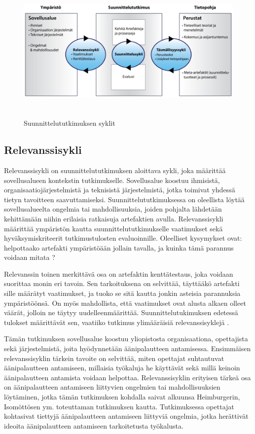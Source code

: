 \documentclass[utf8]{gradu3}
\begin{document}
\begin{figure}[h]\centering
  \includegraphics[height=7cm,keepaspectratio]{DSR}
  \caption[]{Suunnittelututkimuksen syklit}
  \label{fig:dsr}
\end{figure}

\subsection{Relevanssisykli}

Relevanssisykli on suunnittelututkimuksen aloittava sykli, joka määrittää sovellusalueen kontekstin tutkimukselle. Sovellusalue koostuu ihmisistä, organisaatiojärjestelmistä ja teknisistä järjestelmistä, jotka toimivat yhdessä tietyn tavoitteen saavuttamiseksi. Suunnittelututkimuksessa on oleellista löytää sovellusalueelta ongelmia tai mahdollisuuksia, joiden pohjalta lähdetään kehittämään niihin erilaisia ratkaisuja artefaktien avulla. Relevanssisykli määrittää ympäristön kautta suunnittelututkimukselle vaatimukset sekä hyväksymiskriteerit tutkimustulosten evaluoinnille. Oleelliset kysymykset ovat: helpottaako artefakti ympäristöään jollain tavalla, ja kuinka tämä parannus voidaan mitata \parencite[][]{cycles}?

Relevanssin toinen merkittävä osa on artefaktin kenttätestaus, joka voidaan suorittaa monin eri tavoin. Sen tarkoituksena on selvittää, täyttääkö artefakti sille määrätyt vaatimukset, ja tuoko se sitä kautta jonkin asteisia parannuksia ympäristöönsä. On myös mahdollista, että vaatimukset ovat alusta alkaen olleet väärät, jolloin ne täytyy uudelleenmäärittää. Suunnittelutukimuksen edetessä tulokset määrittävät sen, vaatiiko tutkimus ylimääräisiä relevanssisyklejä \parencite[][]{cycles}.

Tämän tutkimuksen sovellusalue koostuu yliopistosta organisaationa, opettajista sekä järjestelmistä, joita hyödynnetään äänipalautteen antamisessa. Ensimmäisen relevanssisyklin tärkein tavoite on selvittää, miten opettajat suhtautuvat äänipalautteen antamiseen, millaisia työkaluja he käyttävät sekä millä keinoin äänipalautteen antamista voidaan helpottaa. Relevanssisyklin erityisen tärkeä osa on äänipalautteen antamiseen liittyvien ongelmien tai mahdollisuuksien löytäminen, jotka tämän tutkimuksen kohdalla saivat alkuunsa Heimburgerin, Isomöttösen ym. \parencite[][]{academics} toteuttaman tutkimuksen kautta. Tutkimuksessa opettajat kohtasivat tiettyjä äänipalautteen antamiseen liittyviä ongelmia, jotka herättivät ideoita äänipalautteen antamiseen tarkoitetusta työkalusta.
\end{document}
